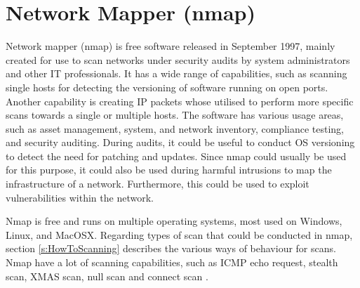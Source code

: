 \section{Network Mapper (nmap)}
\label{s:HowNmapWorks}
Network mapper (nmap) is free software released in September 1997, mainly created for use to scan networks under security audits by system administrators and other IT professionals.
It has a wide range of capabilities, such as scanning single hosts for detecting the versioning of software running on open ports. Another capability is creating IP packets whose utilised to perform more specific scans towards a single or multiple hosts. The software has various usage areas, such as asset management, system, and network inventory, compliance testing, and security auditing. During audits, it could be useful to conduct OS versioning to detect the need for patching and updates. Since nmap could usually be used for this purpose, it could also be used during harmful intrusions to map the infrastructure of a network. Furthermore, this could be used to exploit vulnerabilities within the network.

Nmap is free and runs on multiple operating systems, most used on Windows, Linux, and MacOSX.
Regarding types of scan that could be conducted in nmap, section \ref{s:HowToScanning} describes the various ways of behaviour for scans. Nmap have a lot of scanning capabilities, such as ICMP echo request, stealth scan, XMAS scan, null scan and connect scan \autocite{pinkard2008nmap}.
